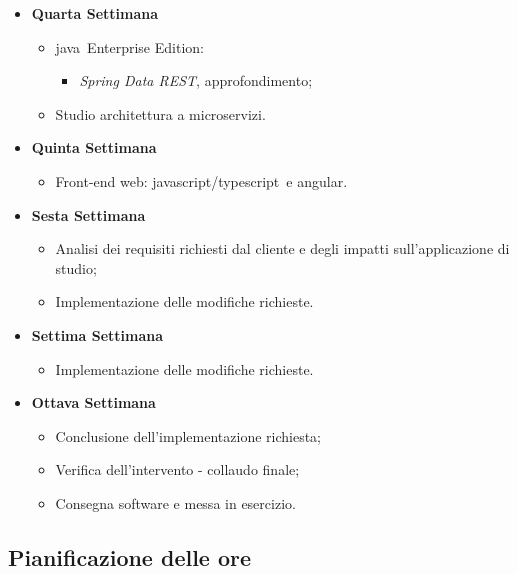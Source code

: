 \begin{itemize}
	\item \textbf{Quarta Settimana}
	\begin{itemize}
		\item \gls{java}\gloss\ Enterprise Edition:
		\begin{itemize}
			\item \textit{Spring Data REST}, approfondimento; %
		\end{itemize}
		\item Studio architettura a microservizi. %
	\end{itemize}

	\clearpage

	\item \textbf{Quinta Settimana}
	\begin{itemize}
		\item Front-end web: \gls{javascript}\gloss/\gls{typescript}\gloss\ e \gls{angular}\gloss.
	\end{itemize}

	\item \textbf{Sesta Settimana}
	\begin{itemize}
		\item Analisi dei requisiti richiesti dal cliente e degli impatti sull'applicazione di studio;
		\item Implementazione delle modifiche richieste.
	\end{itemize}

	\item \textbf{Settima Settimana}
	\begin{itemize}
		\item Implementazione delle modifiche richieste.
	\end{itemize}

	\item \textbf{Ottava Settimana}
	\begin{itemize}
		\item Conclusione dell'implementazione richiesta;
		\item Verifica dell'intervento - collaudo finale;
		\item Consegna software e messa in esercizio.
	\end{itemize}
\end{itemize}


\clearpage

\subsection{Pianificazione delle ore}

